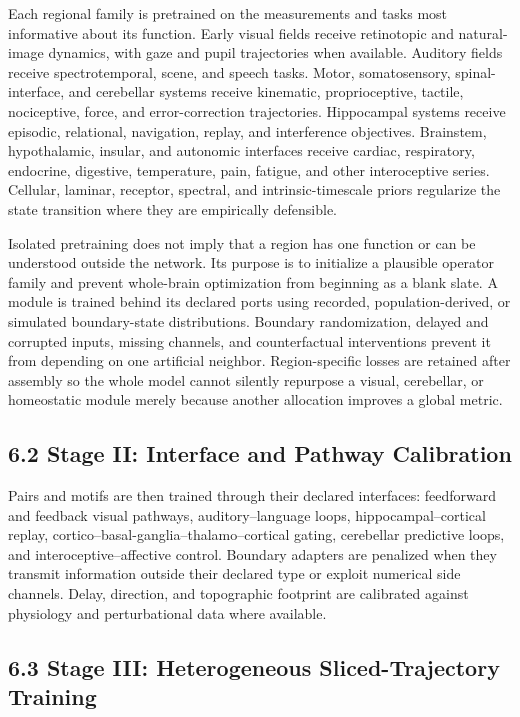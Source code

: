 Each regional family is pretrained on the measurements and tasks most
informative about its function. Early visual fields receive retinotopic and
natural-image dynamics, with gaze and pupil trajectories when available.
Auditory fields receive spectrotemporal, scene, and speech tasks. Motor,
somatosensory, spinal-interface, and cerebellar systems receive kinematic,
proprioceptive, tactile, nociceptive, force, and error-correction trajectories.
Hippocampal systems receive episodic, relational, navigation, replay, and
interference objectives. Brainstem, hypothalamic, insular, and autonomic
interfaces receive cardiac, respiratory, endocrine, digestive, temperature,
pain, fatigue, and other interoceptive series. Cellular, laminar, receptor,
spectral, and intrinsic-timescale priors regularize the state transition where
they are empirically defensible.

Isolated pretraining does not imply that a region has one function or can be
understood outside the network. Its purpose is to initialize a plausible
operator family and prevent whole-brain optimization from beginning as a blank
slate. A module is trained behind its declared ports using recorded,
population-derived, or simulated boundary-state distributions. Boundary
randomization, delayed and corrupted inputs, missing channels, and
counterfactual interventions prevent it from depending on one artificial
neighbor. Region-specific losses are retained after assembly so the whole
model cannot silently repurpose a visual, cerebellar, or homeostatic module
merely because another allocation improves a global metric.

\subsection{6.2 Stage II: Interface and Pathway Calibration}

Pairs and motifs are then trained through their declared interfaces:
feedforward and feedback visual pathways, auditory--language loops,
hippocampal--cortical replay, cortico--basal-ganglia--thalamo--cortical
gating, cerebellar predictive loops, and interoceptive--affective control.
Boundary adapters are penalized when they transmit information outside their
declared type or exploit numerical side channels. Delay, direction, and
topographic footprint are calibrated against physiology and perturbational
data where available.

\subsection{6.3 Stage III: Heterogeneous Sliced-Trajectory Training}

